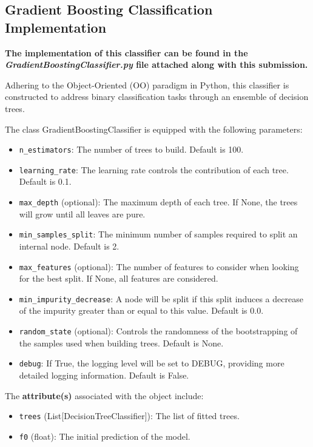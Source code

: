 \begin{appendices}
  \subsection{Gradient Boosting Classification Implementation} \label{app:sec:gb_implementation}

  \textbf{The implementation of this classifier can be found in the \textit{GradientBoostingClassifier.py} file attached along with this submission.}

  Adhering to the Object-Oriented (OO) paradigm in Python, this classifier is constructed to address binary classification tasks through an ensemble of decision trees.

  The class GradientBoostingClassifier is equipped with the following parameters:
  \begin{itemize}
    \item \texttt{n\_estimators}: The number of trees to build. Default is 100.
    \item \texttt{learning\_rate}: The learning rate controls the contribution of each tree. Default is 0.1.
    \item \texttt{max\_depth} (optional): The maximum depth of each tree. If None, the trees will grow until all leaves are pure.
    \item \texttt{min\_samples\_split}: The minimum number of samples required to split an internal node. Default is 2.
    \item \texttt{max\_features} (optional): The number of features to consider when looking for the best split. If None, all features are considered.
    \item \texttt{min\_impurity\_decrease}: A node will be split if this split induces a decrease of the impurity greater than or equal to this value. Default is 0.0.
    \item \texttt{random\_state} (optional): Controls the randomness of the bootstrapping of the samples used when building trees. Default is None.
    \item \texttt{debug}: If True, the logging level will be set to DEBUG, providing more detailed logging information. Default is False.
  \end{itemize}

  The \textbf{attribute(s)} associated with the object include:
  \begin{itemize}
    \item \texttt{trees} (List[DecisionTreeClassifier]): The list of fitted trees.
    \item \texttt{f0} (float): The initial prediction of the model.
  \end{itemize}


\end{appendices}
